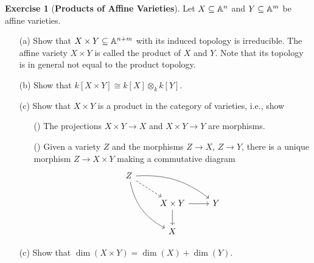 \documentclass[11pt]{book}
\theoremstyle{definition}
\newtheorem{exercise}{Exercise}[section]
\begin{document}
\begin{exercise}[\textbf{Products of Affine Varieties}]
Let $X\subseteq\mathbb{A}^n$ and $Y\subseteq\mathbb{A}^m$ be affine varieties.
\begin{itemize}
\item[(a)] Show that $X\times Y\subseteq\mathbb{A}^{n+m}$ with its induced topology is irreducible. The affine variety $X\times Y$ is called the product of $X$ and $Y$. Note that its topology is in general not equal to the product topology.
\item[(b)] Show that $k[X\times Y]\cong k[X]\otimes_kk[Y]$.
\item[(c)] Show that $X\times Y$ is a product in the category of varieties, i.e., show
\begin{itemize}
\item[(\rmnum{1})] The projections $X\times Y\to X$ and $X\times Y\to Y$ are morphisms.
\item[(\rmnum{2})] Given a variety $Z$ and the morphisms $Z\to X$, $Z\to Y$, there is a unique morphism $Z\to X\times Y$ making a commutative diagram
\[\begin{tikzcd}
Z\ar[rdd,bend right=25pt]\ar[rrd, bend left=20pt]\ar[rd,dashed]&&\\
&X\times Y\ar[d]\ar[r]&Y\\
&X&
\end{tikzcd}\]
\end{itemize}
\item[(c)] Show that $\dim(X\times Y)=\dim(X)+\dim(Y)$.
\end{itemize}
\end{exercise}
\end{document}
